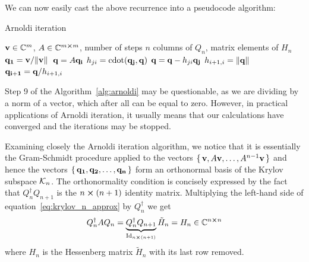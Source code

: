 We can now easily cast the above recurrence into a pseudocode algorithm:
\begin{algorithm}[H]
	\algrenewcommand{}
	\algrenewcommand{}
	\caption{Arnoldi iteration}
	\label{alg:arnoldi}
	\begin{algorithmic}[1]
		\Require \(\vectorbold{v} \in \CC^m\), \(A \in \mathbb{C}^{m\cross m}\), number of steps \(n\)
		\Ensure columns of \(Q_n\), matrix elements of \(H_n\)
		\State \(\vectorbold{q_1} = \vectorbold{v}/\norm*{\vectorbold{v}}\) 
			\State \(\vectorbold{q} = A\vectorbold{q_i}\)
				\State \(h_{ji} = \mathrm{cdot}(\vectorbold{q_j},\vectorbold{q})\) 
				\State \(\vectorbold{q} = \vectorbold{q} - h_{ji}\vectorbold{q_j}\) 
			\EndFor
			\State \(h_{i+1,i} = \norm{\vectorbold{q}} \) 
			\State \(\vectorbold{q_{i+1}} = \vectorbold{q}/h_{i+1,i} \)
		\EndFor
	\end{algorithmic}
\end{algorithm}

Step 9 of the Algorithm~\ref{alg:arnoldi} may be questionable, as we are dividing by a norm of a vector, which
after all can be equal to zero. However, in practical applications of Arnoldi iteration, it usually means
that our calculations have converged and the iterations may be stopped.


Examining closely the Arnoldi iteration algorithm, we notice that it is essentially the Gram-Schmidt
procedure applied to the vectors \(\{\,\vectorbold{v}, A\vectorbold{v},\ldots, A^{n-1}\vectorbold{v}\,\}\) and hence the 
vectors \(\{\,\vectorbold{q_1}, \vectorbold{q_2},\ldots,\vectorbold{q_n}\,\}\) form an orthonormal basis
of the Krylov subspace \(\mathcal{K}_{n}\). The orthonormality condition is concisely expressed by 
the fact that \(Q^{\dagger}_n Q_{n+1} \) is the \(n\cross (n+1)\) identity matrix. Multiplying the left-hand side of
equation~\eqref{eq:krylov_n_approx} by \(Q^{\dagger}_n\) we get
\begin{equation}
	Q^{\dagger}_n A Q_n = \underbrace{Q^{\dagger}_n Q_{n+1}}_{\mathrm{Id}_{n\cross(n+1)}}\tilde{H}_n = H_n \in \mathbb{C}^{n\cross n}
	\label{eq:hessenberg}
\end{equation}
where \(H_n\) is the Hessenberg matrix \(\tilde{H}_n\) with its last row removed. 

